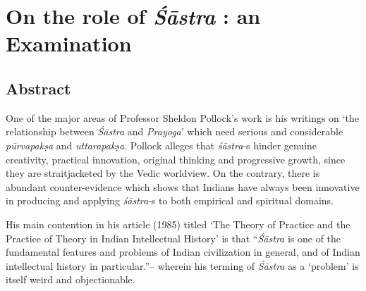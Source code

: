 \chapter{On the role of {\sl\bfseries Śāstra} : an Examination}\label{chapter4}
\vskip -10pt

\vskip -10pt

\section*{Abstract}

One of the major areas of Professor Sheldon Pollock's work is his writings on `the relationship between {\it Śāstra} and {\it Prayoga}' which need serious and considerable {\it pūrvapakṣa} and {\it uttarapakṣa}. Pollock alleges that {\it śāstra}-s hinder genuine creativity, practical innovation, original thinking and progressive growth, since they are straitjacketed by the Vedic worldview. On the contrary, there is abundant counter-evidence which shows that Indians have always been innovative in producing and applying {\it śāstra}-s to both empirical and spiritual domains. 

His main contention in his article (1985) titled `The Theory of Practice and the Practice of Theory in Indian Intellectual History' is that ``{\it Śāstra} is one of the fundamental features and problems of Indian civilization in general, and of Indian intellectual history in particular.''-- wherein his terming of {\it Śāstra} as a `problem' is itself weird and objectionable.  


